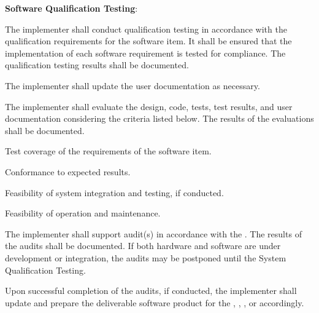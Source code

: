 			\begin{adjustwidth}{2em}{0pt} 

				\begin{compactenum}

					\item {\bf Software Qualification Testing}:

					\begin{compactenum}

						\item The implementer shall conduct qualification testing in accordance with the qualification requirements for the software item. It shall be ensured that the implementation of each software requirement is tested for compliance. The qualification testing results shall be documented.

						\item The implementer shall update the user documentation as necessary.

						\item The implementer shall evaluate the design, code, tests, test results, and user documentation considering the criteria listed below. The results of the evaluations shall be documented.

						\begin{compactenum}

							\item Test coverage of the requirements of the software item.

							\item Conformance to expected results.

							\item Feasibility of system integration and testing, if conducted.

							\item Feasibility of operation and maintenance.

						\end{compactenum}

						\item The implementer shall support audit(s) in accordance with the . The results of the audits shall be documented. If both hardware and software are under development or integration, the audits may be postponed until the System Qualification Testing.

						\item Upon successful completion of the audits, if conducted, the implementer shall update and prepare the deliverable software product for the , , , or  accordingly.

					\end{compactenum}

				\end{compactenum}

			\end{adjustwidth}

